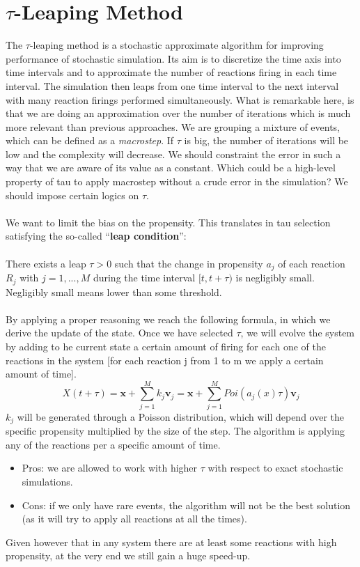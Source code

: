\section{\texorpdfstring{$\tau$-Leaping Method}{-Leaping Method}}
The $\tau$-leaping method is a stochastic approximate algorithm for improving performance of stochastic simulation.
Its aim is to discretize the time axis into time intervals and to approximate the number of reactions firing in each time interval.
The simulation then leaps from one time interval to the next interval with many reaction firings performed simultaneously.
What is remarkable here, is that we are doing an approximation over the number of iterations which is much more relevant than previous approaches.
We are grouping a mixture of events, which can be defined as a \emph{macrostep}.
If $\tau$ is big, the number of iterations will be low and the complexity will decrease.
We should constraint the error in such a way that we are aware of its value as a constant.
Which could be a high-level property of tau to apply macrostep without a crude error in the simulation? We should impose certain logics on $\tau$.
\\
\\
\noindent
We want to limit the bias on the propensity.
This translates in tau selection satisfying the so-called ``\textbf{leap condition}'': 
\\
\\
\noindent
There exists a leap $\tau > 0$ such that the change in propensity $a_j$ of each reaction $R_j$ with $j = 1,...,M$ during the time interval $[t,t +\tau)$ is negligibly small.
Negligibly small means lower than some threshold.
\\
\\
\noindent
By applying a proper reasoning we reach the following formula, in which we derive the update of the state.
Once we have selected $\tau$, we will evolve the system by adding to he current state a certain amount of firing for each one of the reactions in the system {[}for each reaction j from 1 to m we apply a certain amount of time{]}.
$$ X(t+\tau)=\mathbf{x}+\sum_{j=1}^{M}k_j\mathbf{v}_j =\mathbf{x}+\sum_{j=1}^{M}Poi(a_j(x)\tau)\mathbf{v}_j $$
$k_j$ will be generated through a Poisson distribution, which will depend over the specific propensity multiplied by the size of the step.
The algorithm is applying any of the reactions per a specific amount of time.
\begin{itemize}
\item Pros: we are allowed to work with higher $\tau$ with respect to exact stochastic simulations.
\item Cons: if we only have rare events, the algorithm will not be the best solution (as it will try to apply all reactions at all the times).
\end{itemize}
\noindent
Given however that in any system there are at least some reactions with high propensity, at the very end we still gain a huge speed-up.


